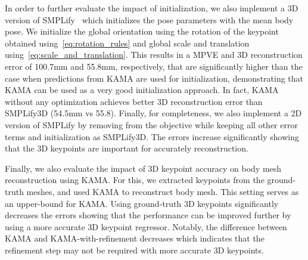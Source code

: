 In order to further evaluate the impact of initialization, we also implement a 3D version of SMPLify~\cite{bogo2016keep} which initializes the pose parameters  with the mean body pose. We initialize the global orientation using the rotation of the  keypoint obtained using~\eqref{eq:rotation_rules} and global scale and translation using~\eqref{eq:scale_and_translation}. This results in a MPVE and 3D reconstruction error of 100.7mm and 55.8mm, respectively, that are significantly higher than the case when predictions from KAMA are used for initialization, demonstrating that KAMA can be used as a very good initialization approach. In fact, KAMA without any optimization achieves better 3D reconstruction error than SMPLify3D (54.5mm vs 55.8). Finally, for completeness, we also implement a 2D version of SMPLify by removing  from the objective while keeping all other error terms and initialization as SMPLify3D. The errors increase significantly showing that the 3D keypoints are important for accurately reconstruction. 

Finally, we also evaluate the impact of 3D keypoint accuracy on body mesh reconstruction using KAMA. For this, we extracted  keypoints from the ground-truth meshes, and used KAMA to reconstruct body mesh. This setting serves as an upper-bound for KAMA. Using ground-truth 3D keypoints significantly decreases the errors showing that the performance can be improved further by using a more accurate 3D keypoint regressor. Notably, the difference between KAMA and KAMA-with-refinement decreases which indicates that the refinement step may not be required with more accurate 3D keypoints. 





